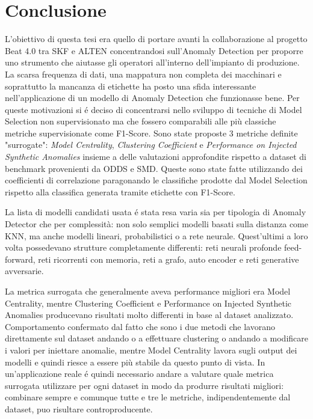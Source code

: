 \chapter{Conclusione}
\label{chap:conclusion}
L'obiettivo di questa tesi era quello di portare avanti la collaborazione al progetto Beat 4.0 tra SKF e ALTEN concentrandosi sull'Anomaly Detection per proporre uno strumento che aiutasse gli operatori all'interno dell'impianto di produzione. La scarsa frequenza di dati, una mappatura non completa dei macchinari e soprattutto la mancanza di etichette ha posto una sfida interessante nell'applicazione di un modello di Anomaly Detection che funzionasse bene.
Per queste motivazioni si é deciso di concentrarsi nello sviluppo di tecniche di Model Selection non supervisionato ma che fossero comparabili alle più classiche metriche supervisionate come F1-Score.
Sono state proposte 3 metriche definite "surrogate": \textit{Model Centrality}, \textit{Clustering Coefficient} e \textit{Performance on Injected Synthetic Anomalies} insieme a delle valutazioni approfondite rispetto a dataset di benchmark provenienti da ODDS e SMD. Queste sono state fatte utilizzando dei coefficienti di correlazione paragonando le classifiche prodotte dal Model Selection rispetto alla classifica generata tramite etichette con F1-Score.

La lista di modelli candidati usata é stata resa varia sia per tipologia di Anomaly Detector che per complessità: non solo semplici modelli basati sulla distanza come KNN, ma anche modelli lineari, probabilistici o a rete neurale. Quest'ultimi a loro volta possedevano strutture completamente differenti: reti neurali profonde feed-forward, reti ricorrenti con memoria, reti a grafo, auto encoder e reti generative avversarie.

La metrica surrogata che generalmente aveva performance migliori era Model Centrality, mentre Clustering Coefficient e Performance on Injected Synthetic Anomalies producevano risultati molto differenti in base al dataset analizzato. Comportamento confermato dal fatto che sono i due metodi che lavorano direttamente sul dataset andando o a effettuare clustering o andando a modificare i valori per iniettare anomalie, mentre Model Centrality lavora sugli output dei modelli e quindi riesce a essere più stabile da questo punto di vista.
In un'applicazione reale é quindi necessario andare a valutare quale metrica surrogata utilizzare per ogni dataset in modo da produrre risultati migliori: combinare sempre e comunque tutte e tre le metriche, indipendentemente dal dataset, puo risultare controproducente.

